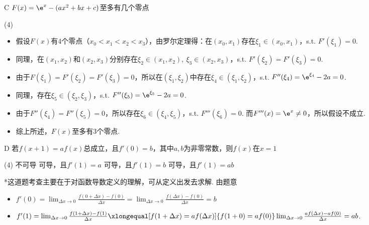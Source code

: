 \begin{choice}{C}
    $F(x)=\e^x-(ax^2+bx+c)$至多有几个零点
\begin{tasks}(4)
\end{tasks}
\end{choice}
\begin{solution}
\begin{itemize}
    \item 假设$F(x)$有4个零点（$x_0<x_1<x_2<x_3$），由罗尔定理得：在$(x_0,x_1)$存在$\xi_1\in(x_0,x_1)$，s.t. $F'(\xi_1)=0$.
    \item 同理，在$(x_1,x_2)$和$(x_2,x_3)$分别存在$\xi_2\in(x_1,x_2),\ \xi_3\in(x_2,x_3)$，s.t. $F'(\xi_2)=F'(\xi_3)=0$.
    \item 由于$F(\xi_1)=F'(\xi_2)=F'(\xi_3)=0$，所以在$(\xi_1,\xi_2)$中存在$\xi_4\in (\xi_1,\xi_2)$，s.t. $F''(\xi_4)=\e^{\xi_4}-2a=0$.
    \item 同理，存在$\xi_5\in(\xi_2,\xi_3)$，s.t. $F''(\xi_5)=\e^{\xi_5}-2a=0$.
    \item 由于$F''(\xi_4)=F''(\xi_5)=0$，所以存在$\xi_6\in(\xi_4,\xi_5)$，s.t. $F'''(\xi_6)=0$. 而$F'''(x)=\e^x\neq 0$，所以假设不成立.
    \item 综上所述，$F(x)$至多有3个零点.
\end{itemize}
\end{solution}

\begin{choice}{D}
    若$f(x+1)=af(x)$总成立，且$f'(0)=b$，其中$a,b$为非零常数，则$f(x)$在$x=1$
\begin{tasks}(4)
    \task 不可导
    \task 可导，且$f'(1)=a$
    \task 可导，且$f'(1)=b$
    \task 可导，且$f'(1)=ab$
\end{tasks}
\end{choice}
\begin{solution}*这道题考查主要在于对函数导数定义的理解，可从定义出发去求解. 由题意
\begin{itemize}
    \item $f'(0)=\lim_{\Delta x\to 0}\frac{f(0+\Delta x)-f(0)}{\Delta x}=\lim_{\Delta x\to 0}\frac{f(\Delta x)-f(0)}{\Delta x}=b$
    \item $f'(1)=\lim_{\Delta x\to 0}\frac{f(1+\Delta x)-f(1)}{\Delta x}\xlongequal[f(1+\Delta x)=af(\Delta x)]{f(1+0)=af(0)}\lim_{\Delta x\to 0}\frac{af(\Delta x)-af(0)}{\Delta x}=ab$.
\end{itemize}    
\end{solution}

